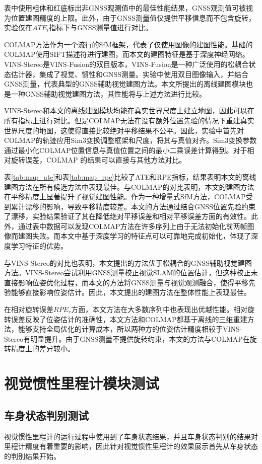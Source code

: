 表中使用粗体和红底标出非GNSS观测值中的最佳性能结果，GNSS观测值可被视为位置建图精度的上限。此外，由于GNSS测量值仅提供平移信息而不包含旋转，实验仅在$ATE_t$指标下与GNSS测量值进行对比。

COLMAP方法作为一个流行的SfM框架，代表了仅使用图像的建图性能。基础的COLMAP使用SIFT\cite{lowe2004distinctive}描述符进行建图，而本文的建图特征是基于深度神经网络。VINS-Stereo是VINS-Fusion的双目版本，VINS-Fusion是一种广泛使用的松耦合状态估计器，集成了视觉、惯性和GNSS测量。实验中使用双目图像输入，并结合GNSS测量，代表典型的GNSS辅助视觉建图方法。本文所提出的离线建图模块也是一种GNSS辅助视觉建图方法，其性能将与上述方法进行比较。

VINS-Stereo和本文的离线建图模块均能在真实世界尺度上建立地图，因此可以在所有指标上进行对比。但是COLMAP无法在没有额外位置先验的情况下重建真实世界尺度的地图，这使得直接比较绝对平移结果不公平。因此，实验中首先对COLMAP的轨迹应用Sim3变换调整框架和尺度，将其与真值对齐。Sim3变换参数通过最小化COLMAP位置信息与真值位置之间的最小二乘误差计算得到。对于相对旋转误差，COLMAP 的结果可以直接与其他方法对比。

表\ref{tab:map_ate}和表\ref{tab:map_rpe}比较了ATE和RPE指标，结果表明本文的离线建图方法在所有候选方法中表现最佳。与COLMAP的对比表明，本文的建图方法在平移精度上显著提升了视觉建图性能。作为一种增量式SfM方法，COLMAP受到累计漂移的影响，导致平移精度较差。本文的方法通过结合GNSS位置先验约束了漂移，实验结果验证了其在降低绝对平移误差和相对平移误差方面的有效性。此外，通过表中数据可以发现COLMAP方法在许多序列上由于无法初始化前两帧图像而建图失败。而本文中基于深度学习的特征点可以可靠地完成初始化，体现了深度学习特征的优势。

与VINS-Stereo的对比也表明，本文提出的方法优于松耦合的GNSS辅助视觉建图方法。VINS-Stereo尝试利用GNSS测量校正视觉SLAM的位置估计，但这种校正未直接影响位姿优化过程，而本文的方法将GNSS测量与视觉观测融合，使得平移先验能够直接影响位姿估计。因此，本文提出的建图方法在整体性能上表现最佳。

在相对旋转误差$RPE_r$方面，本文方法在大多数序列中也表现出优越性能。相对旋转误差反映了位姿估计的准确性，本文方法和COLMAP都基于离线的三维重建方法，能够支持全局优化的计算成本，所以两种方的位姿估计精度相较于VINS-Stereo有明显提升。由于GNSS测量不提供旋转约束，本文的方法与COLMAP在旋转精度上的差异较小。

\section{视觉惯性里程计模块测试}

\subsection{车身状态判别测试}
视觉惯性里程计的运行过程中使用到了车身状态结果，并且车身状态判别的结果对里程计精度有着重要的影响，因此针对视觉惯性里程计的效果展示首先从车身状态的判别结果开始。


